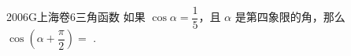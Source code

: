 
\begin{problem}{2006}{G}{上海卷}{6}{三角函数}
如果 $ \cos \alpha = \dfrac{1}{5} $，且 $ \alpha $ 是第四象限的角，那么 $ \cos\left(\alpha + \dfrac{\pi}{2}\right) = $ \underline{\hspace{4em}}.
\end{problem}

\begin{answer}

\end{answer}

\begin{solutions}

\end{solutions}